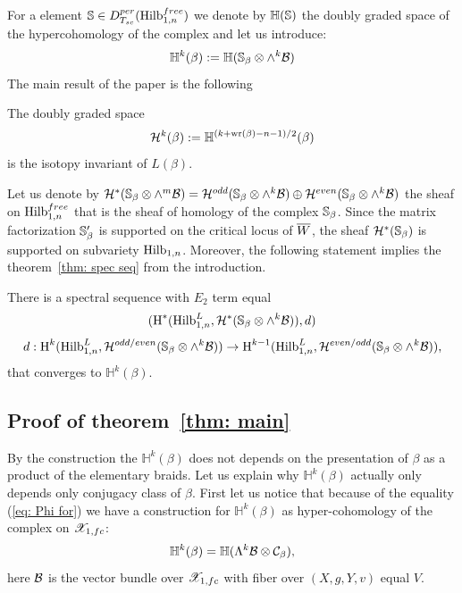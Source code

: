 \documentclass[10pt]{amsart}
\begin{document}



For a element $\mathbb{S}\in D^{per}_{T_{sc}}(\mathrm{Hilb}^{free}_{1,n})$ we denote by $\mathbb{H}(\mathbb{S})$ the doubly graded space of the hypercohomology of the complex and let us introduce:
$$\mathbb{H}^k(\beta):=\mathbb{H}(\mathbb{S}_\beta\otimes \wedge^k\mathcal{B})$$
 The main result of the paper is the following

\begin{theorem}\label{thm: main} The doubly graded space
$$\mathcal{H}^k(\beta):=\mathbb{H}^{(k+\mathrm{wr}(\beta)-n-1)/2}(\beta)$$
is the isotopy invariant of $L(\beta)$.
\end{theorem}

Let us denote by $\mathcal{H}^*(\mathbb{S}_\beta\otimes \wedge^m\mathcal{B})=\mathcal{H}^{odd}(\mathbb{S}_\beta\otimes\wedge^k \mathcal{B})\oplus\mathcal{H}^{even}(\mathbb{S}_\beta\otimes\wedge^k\mathcal{B})$ the sheaf on $\mathrm{Hilb}^{free}_{1,n}$ that is the sheaf of homology of the complex $\mathbb{S}_\beta$. Since
the matrix factorization $\mathbb{S}'_\beta$ is supported on the critical locus of $\overline{W}$, the sheaf $\mathcal{H}^*(\mathbb{S}_\beta)$ is supported on subvariety $\mathrm{Hilb}_{1,n}$. Moreover, the following statement implies
the theorem~\ref{thm: spec seq} from the introduction.

\begin{corollary} There is a spectral sequence with $E_2$ term equal
$$ (\textup{H}^*(\mathrm{Hilb}^L_{1,n},\mathcal{H}^*(\mathbb{S}_\beta\otimes\wedge^k\mathcal{B})),d)$$
$$
d: \textup{H}^k(\mathrm{Hilb}^L_{1,n},\mathcal{H}^{odd/even}(\mathbb{S}_\beta\otimes\wedge^k\mathcal{B}))\to
\textup{H}^{k-1}(\mathrm{Hilb}^L_{1,n},\mathcal{H}^{even/odd}(\mathbb{S}_\beta\otimes\wedge^k\mathcal{B})),$$
that converges to $\mathbb{H}^k(\beta)$.
\end{corollary}


\subsection{Proof of theorem~\ref{thm: main}}
By the construction the $\mathbb{H}^k(\beta)$ does not depends on the presentation of $\beta$ as a product of the elementary braids.
Let us explain why $\mathbb{H}^k(\beta)$ actually only depends only conjugacy class of $\beta$.
First let us notice that because of the equality (\ref{eq: Phi for}) we have a construction for $\mathbb{H}^k(\beta)$ as hyper-cohomology of the complex on
$\mathscr{X}_{1,fc}$:
$$\mathbb{H}^k(\beta)=\mathbb{H}(\Lambda^k\mathcal{B}\otimes \mathcal{C}_\beta),$$
here $\mathcal{B}$ is the vector bundle over $\mathscr{X}_{1,fc}$ with fiber over $(X,g,Y,v)$ equal $V$.
\end{document}

